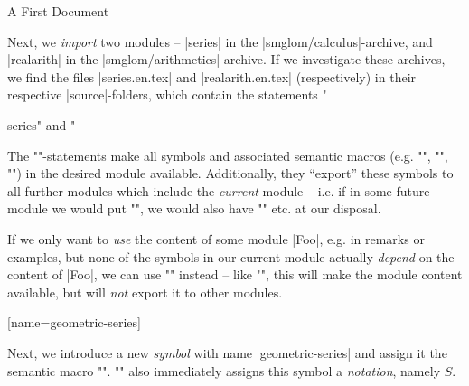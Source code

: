 \begin{sfragment}{A First \sTeX Document}
    \begin{latexcode}[numbers=none,aboveskip=0pt,belowskip=0pt,gobble=8]
    \end{latexcode}
    \begin{function}{\importmodule}
      Next, we \emph{import} two modules -- 
      |series| in the |smglom/calculus|-archive, and |realarith| in
      the |smglom/arithmetics|-archive. If we investigate these archives,
      we find the files |series.en.tex| and |realarith.en.tex| (respectively) 
      in their respective |source|-folders, which contain 
      the statements \stexcode"\begin{smodule}{series}" and \stexcode"\end{smodule}\fi

      The \stexcode"\importmodule"-statements make all \stex symbols and associated
      semantic macros (e.g. \stexcode"\infinitesum", \stexcode"\realdivide", 
      \stexcode"\realpower")
      in the desired module available. Additionally, they ``export''
      these symbols to all further modules which include the \emph{current}
      module -- i.e. if in some future module we would put
      \stexcode"", we would also have \stexcode"\infinitesum"
      etc. at our disposal.
    \end{function}

    \begin{function}{\usemodule}
      If we only want to \emph{use} the content of some module |Foo|,
      e.g. in remarks or examples, but none
      of the symbols in our current module actually \emph{depend} on
      the content of |Foo|, we can use \stexcode"\usemodule" instead -- like
      \stexcode"\importmodule", this will make the module content available,
      but will \emph{not} export it to other modules.
    \end{function}\bigskip

    \begin{latexcode}[numbers=none,aboveskip=0pt,belowskip=0pt,gobble=6]
      [name=geometric-series]{}
    \end{latexcode}
    \begin{function}{\symdef}
      Next, we introduce a new \emph{symbol} with name
      |geometric-series| and assign it the semantic macro
      \stexcode"\geometricSeries".
      \stexcode"\symdef" also immediately assigns this symbol a \emph{notation},
      namely $S$.
    \end{function}


\end{sfragment}
